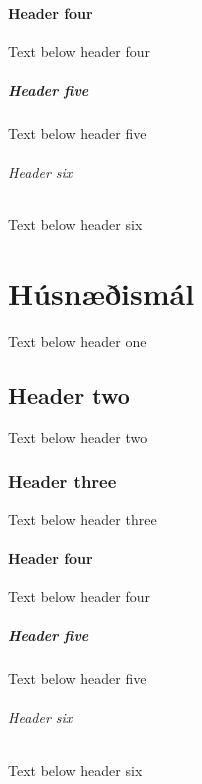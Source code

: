 \documentclass[a4paper,10pt,icelandic]{sphinxmanual}
\begin{document}
\subsubsection{Header four}
\label{\detokenize{vidbrogd-vid-fjarhagsafollum/index:header-four}}
\sphinxAtStartPar
Text below header four


\paragraph{Header five}
\label{\detokenize{vidbrogd-vid-fjarhagsafollum/index:header-five}}
\sphinxAtStartPar
Text below header five


\subparagraph{Header six}
\label{\detokenize{vidbrogd-vid-fjarhagsafollum/index:header-six}}
\sphinxAtStartPar
Text below header six

\sphinxstepscope


\chapter{Húsnæðismál}
\label{\detokenize{husnaedismal/index:husnaeismal}}\label{\detokenize{husnaedismal/index::doc}}
\sphinxAtStartPar
Text below header one


\section{Header two}
\label{\detokenize{husnaedismal/index:header-two}}
\sphinxAtStartPar
Text below header two


\subsection{Header three}
\label{\detokenize{husnaedismal/index:header-three}}
\sphinxAtStartPar
Text below header three


\subsubsection{Header four}
\label{\detokenize{husnaedismal/index:header-four}}
\sphinxAtStartPar
Text below header four


\paragraph{Header five}
\label{\detokenize{husnaedismal/index:header-five}}
\sphinxAtStartPar
Text below header five


\subparagraph{Header six}
\label{\detokenize{husnaedismal/index:header-six}}
\sphinxAtStartPar
Text below header six
\end{document}
